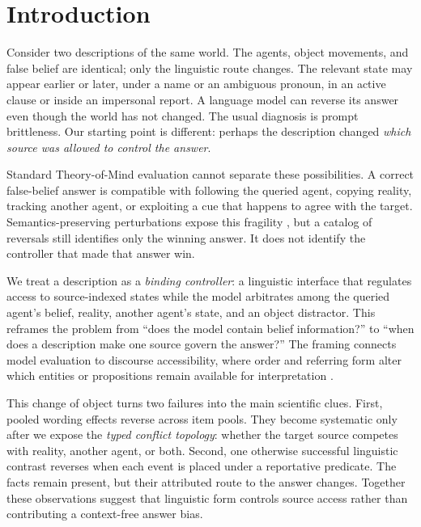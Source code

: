 \section{Introduction}

Consider two descriptions of the same world. The agents, object movements,
and false belief are identical; only the linguistic route changes. The relevant
state may appear earlier or later, under a name or an ambiguous pronoun, in an
active clause or inside an impersonal report. A language model can reverse its
answer even though the world has not changed. The usual diagnosis is prompt
brittleness. Our starting point is different: perhaps the description changed
\emph{which source was allowed to control the answer}.

Standard Theory-of-Mind evaluation cannot separate these possibilities. A
correct false-belief answer is compatible with following the queried agent,
copying reality, tracking another agent, or exploiting a cue that happens to
agree with the target. Semantics-preserving perturbations expose this fragility
\citep{ullman2023trivial,shapira2024cleverhans}, but a catalog of reversals still
identifies only the winning answer. It does not identify the controller that
made that answer win.

We treat a description as a \emph{binding controller}: a linguistic interface
that regulates access to source-indexed states while the model arbitrates among
the queried agent's belief, reality, another agent's state, and an object
distractor. This reframes the problem from ``does the model contain belief
information?'' to ``when does a description make one source govern the
answer?'' The framing connects model evaluation to discourse accessibility,
where order and referring form alter which entities or propositions remain
available for interpretation
\citep{gundel1993givenness,grosz1995centering,webster-nothman-2016-using}.

This change of object turns two failures into the main scientific clues. First,
pooled wording effects reverse across item pools. They become systematic only
after we expose the \emph{typed conflict topology}: whether the target source
competes with reality, another agent, or both. Second, one otherwise successful
linguistic contrast reverses when each event is placed under a reportative
predicate. The facts remain present, but their attributed route to the answer
changes. Together these observations suggest that linguistic form controls
source access rather than contributing a context-free answer bias.

